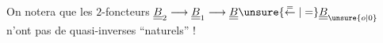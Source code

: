 

On notera que les $2$-foncteurs $\underline{\underline B}_2\longrightarrow\underline{\underline B}_1\longrightarrow\underline{\underline B}\unsure{\overset{=}{\leftarrow}|=}\underline{\underline B}_{\unsure{o|0}}$ n'ont pas de quasi-inverses ``naturels'' !

